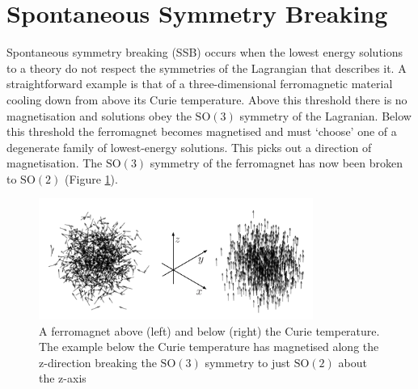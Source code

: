 \section{Spontaneous Symmetry Breaking}
Spontaneous symmetry breaking (SSB) occurs when the lowest energy solutions to a theory do not respect the symmetries of the Lagrangian that describes it. 
A straightforward example is that of a three-dimensional ferromagnetic material cooling down from above its Curie temperature.
Above this threshold there is no magnetisation and solutions obey the $\mathrm{SO}(3)$ symmetry of the Lagranian. 
Below this threshold the ferromagnet becomes magnetised and must `choose' one of a degenerate family of lowest-energy solutions. This picks out a direction of magnetisation. The $\mathrm{SO}(3)$ symmetry of the ferromagnet has now been broken to $\mathrm{SO}(2)$ (Figure \ref{fig:theory:ferromagnet_ssb}).

\begin{figure}[h!]
\includegraphics[width=0.8\textwidth]{figures/theory/ferromagnet_ssb.pdf}
\caption{A ferromagnet above (left) and below (right) the Curie temperature. The example below the Curie temperature has magnetised along the z-direction breaking the $\mathrm{SO}(3)$ symmetry to just $\mathrm{SO}(2)$ about the z-axis}
\label{fig:theory:ferromagnet_ssb}
\end{figure}

